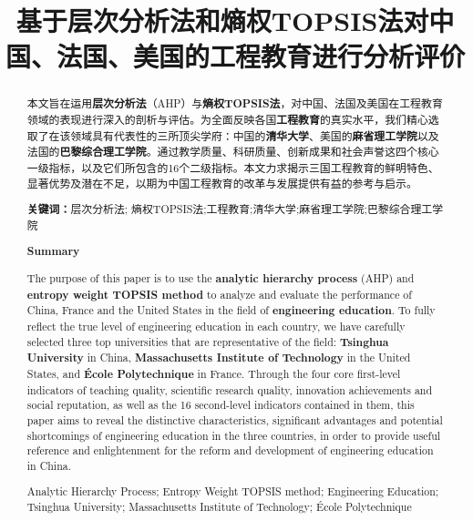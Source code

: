 \documentclass{mcmthesis}
\title{基于层次分析法和熵权TOPSIS法对中国、法国、美国的工程教育进行分析评价}
\begin{document}
\begin{abstract}
	
本文旨在运用\textbf{层次分析法}（AHP）与\textbf{熵权TOPSIS法}，对中国、法国及美国在工程教育领域的表现进行深入的剖析与评估。为全面反映各国\textbf{工程教育}的真实水平，我们精心选取了在该领域具有代表性的三所顶尖学府：中国的\textbf{清华大学}、美国的\textbf{麻省理工学院}以及法国的\textbf{巴黎综合理工学院}。通过教学质量、科研质量、创新成果和社会声誉这四个核心一级指标，以及它们所包含的16个二级指标。本文力求揭示三国工程教育的鲜明特色、显著优势及潜在不足，以期为中国工程教育的改革与发展提供有益的参考与启示。

\textbf{关键词：}层次分析法; 熵权TOPSIS法;工程教育;清华大学;麻省理工学院;巴黎综合理工学院
\begin{center}
	\textbf{Summary}
\end{center}

The purpose of this paper is to use the \textbf{analytic hierarchy process} (AHP) and \textbf{entropy weight TOPSIS method} to analyze and evaluate the performance of China, France and the United States in the field of \textbf{engineering education}. To fully reflect the true level of engineering education in each country, we have carefully selected three top universities that are representative of the field: \textbf{Tsinghua University} in China, \textbf{Massachusetts Institute of Technology} in the United States, and\textbf{ École Polytechnique} in France. Through the four core first-level indicators of teaching quality, scientific research quality, innovation achievements and social reputation, as well as the 16 second-level indicators contained in them, this paper aims to reveal the distinctive characteristics, significant advantages and potential shortcomings of engineering education in the three countries, in order to provide useful reference and enlightenment for the reform and development of engineering education in China.
\begin{keywords}
Analytic Hierarchy Process; Entropy Weight TOPSIS method; Engineering Education; Tsinghua University; Massachusetts Institute of Technology; École Polytechnique
\end{keywords}
\end{abstract}
\maketitle

\newpage

\end{document}
